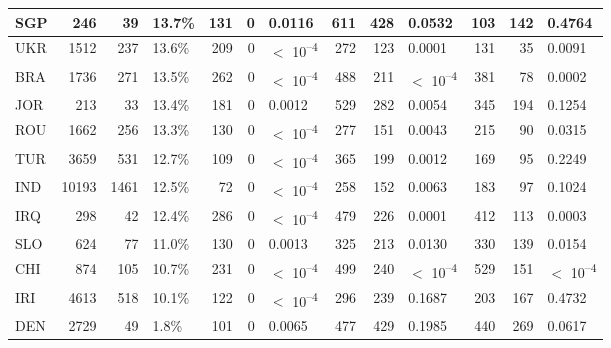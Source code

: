 \begin{tabular}{l|r|r|l|r|r|l|r|r|l|r|r|l}
\hline
SGP & 246 & 39 & 13.7\% & 131 & 0 & 0.0116 & 611 & 428 & 0.0532 & 103 & 142 & 0.4764\\
\hline
UKR & 1512 & 237 & 13.6\% & 209 & 0 & $<$ 10\textsuperscript{--4} & 272 & 123 & 0.0001 & 131 & 35 & 0.0091\\
\hline
BRA & 1736 & 271 & 13.5\% & 262 & 0 & $<$ 10\textsuperscript{--4} & 488 & 211 & $<$ 10\textsuperscript{--4} & 381 & 78 & 0.0002\\
\hline
JOR & 213 & 33 & 13.4\% & 181 & 0 & 0.0012 & 529 & 282 & 0.0054 & 345 & 194 & 0.1254\\
\hline
ROU & 1662 & 256 & 13.3\% & 130 & 0 & $<$ 10\textsuperscript{--4} & 277 & 151 & 0.0043 & 215 & 90 & 0.0315\\
\hline
TUR & 3659 & 531 & 12.7\% & 109 & 0 & $<$ 10\textsuperscript{--4} & 365 & 199 & 0.0012 & 169 & 95 & 0.2249\\
\hline
IND & 10193 & 1461 & 12.5\% & 72 & 0 & $<$ 10\textsuperscript{--4} & 258 & 152 & 0.0063 & 183 & 97 & 0.1024\\
\hline
IRQ & 298 & 42 & 12.4\% & 286 & 0 & $<$ 10\textsuperscript{--4} & 479 & 226 & 0.0001 & 412 & 113 & 0.0003\\
\hline
SLO & 624 & 77 & 11.0\% & 130 & 0 & 0.0013 & 325 & 213 & 0.0130 & 330 & 139 & 0.0154\\
\hline
CHI & 874 & 105 & 10.7\% & 231 & 0 & $<$ 10\textsuperscript{--4} & 499 & 240 & $<$ 10\textsuperscript{--4} & 529 & 151 & $<$ 10\textsuperscript{--4}\\
\hline
IRI & 4613 & 518 & 10.1\% & 122 & 0 & $<$ 10\textsuperscript{--4} & 296 & 239 & 0.1687 & 203 & 167 & 0.4732\\
\hline
DEN & 2729 & 49 & 1.8\% & 101 & 0 & 0.0065 & 477 & 429 & 0.1985 & 440 & 269 & 0.0617\\
\hline
\end{tabular}
